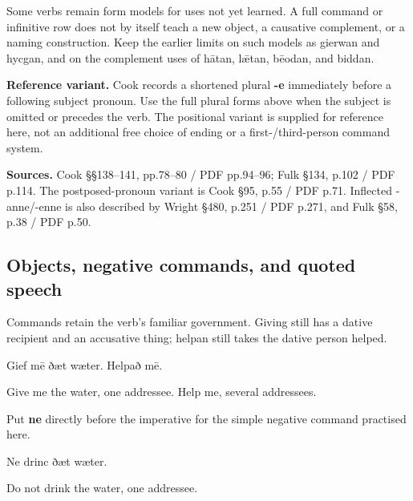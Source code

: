 Some verbs remain form models for uses not yet learned. A full command or infinitive row does not by itself teach a new object, a causative complement, or a naming construction. Keep the earlier limits on such models as gierwan and hycgan, and on the complement uses of hātan, lǣtan, bēodan, and biddan.

\textbf{Reference variant.} Cook records a shortened plural \textbf{-e} immediately before a following subject pronoun. Use the full plural forms above when the subject is omitted or precedes the verb. The positional variant is supplied for reference here, not an additional free choice of ending or a first-/\allowbreak{}third-person command system.

\textbf{Sources.} Cook §§138–141, pp.78–80 /\allowbreak{} PDF pp.94–96; Fulk §134, p.102 /\allowbreak{} PDF p.114. The postposed-pronoun variant is Cook §95, p.55 /\allowbreak{} PDF p.71. Inflected -anne/\allowbreak{}-enne is also described by Wright §480, p.251 /\allowbreak{} PDF p.271, and Fulk §58, p.38 /\allowbreak{} PDF p.50.

\subsection*{Objects, negative commands, and quoted speech}

Commands retain the verb’s familiar government. Giving still has a dative recipient and an accusative thing; helpan still takes the dative person helped.

Gief mē ðæt wæter. Helpað mē.

Give me the water, one addressee. Help me, several addressees.

Put \textbf{ne} directly before the imperative for the simple negative command practised here.

Ne drinc ðæt wæter.

Do not drink the water, one addressee.


